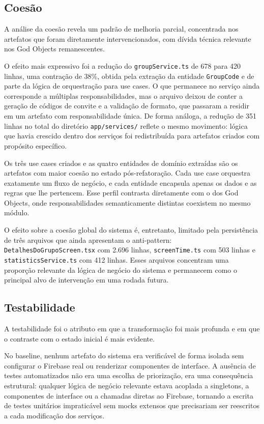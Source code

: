 \documentclass[sigconf,anonymous]{acmart}
\begin{document}
\subsection{Coesão}

A análise da coesão revela um padrão de melhoria parcial, concentrada nos artefatos que foram diretamente intervencionados, com dívida técnica relevante nos God Objects remanescentes.

O efeito mais expressivo foi a redução do \texttt{groupService.ts} de 678 para 420 linhas, uma contração de 38\%, obtida pela extração da entidade \texttt{GroupCode} e de parte da lógica de orquestração para use cases. O que permanece no serviço ainda corresponde a múltiplas responsabilidades, mas o arquivo deixou de conter a geração de códigos de convite e a validação de formato, que passaram a residir em um artefato com responsabilidade única. De forma análoga, a redução de 351 linhas no total do diretório \texttt{app/services/} reflete o mesmo movimento: lógica que havia crescido dentro dos serviços foi redistribuída para artefatos criados com propósito específico.

Os três use cases criados e as quatro entidades de domínio extraídas são os artefatos com maior coesão no estado pós-refatoração. Cada use case orquestra exatamente um fluxo de negócio, e cada entidade encapsula apenas os dados e as regras que lhe pertencem. Esse perfil contrasta diretamente com o dos God Objects, onde responsabilidades semanticamente distintas coexistem no mesmo módulo.

O efeito sobre a coesão global do sistema é, entretanto, limitado pela persistência de três arquivos que ainda apresentam o anti-pattern: \texttt{DetalhesDoGrupoScreen.tsx} com 2.696 linhas, \texttt{screenTime.ts} com 503 linhas e \texttt{statisticsService.ts} com 412 linhas. Esses arquivos concentram uma proporção relevante da lógica de negócio do sistema e permanecem como o principal alvo de intervenção em uma rodada futura.

\subsection{Testabilidade}

A testabilidade foi o atributo em que a transformação foi mais profunda e em que o contraste com o estado inicial é mais evidente.

No baseline, nenhum artefato do sistema era verificável de forma isolada sem configurar o Firebase real ou renderizar componentes de interface. A ausência de testes automatizados não era uma escolha de priorização, era uma consequência estrutural: qualquer lógica de negócio relevante estava acoplada a singletons, a componentes de interface ou a chamadas diretas ao Firebase, tornando a escrita de testes unitários impraticável sem mocks extensos que precisariam ser reescritos a cada modificação dos serviços.
\end{document}
